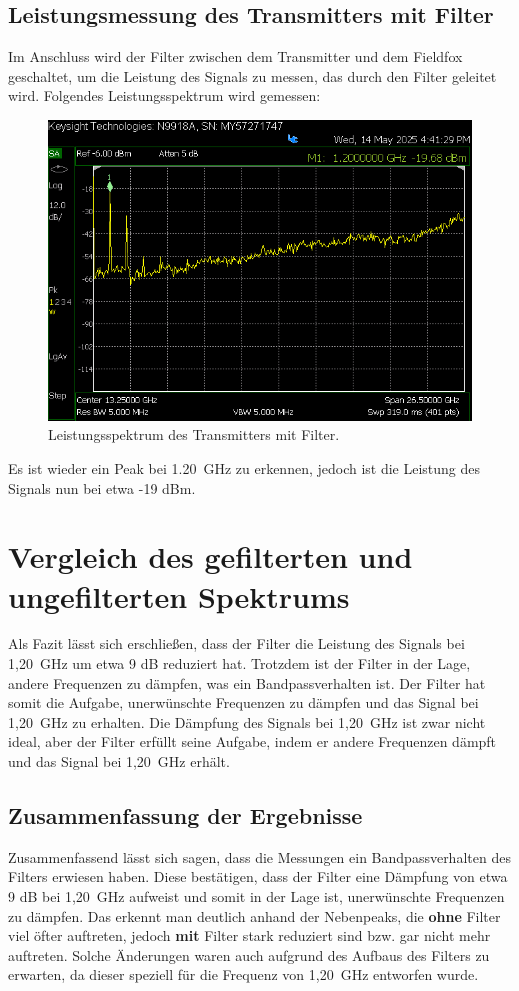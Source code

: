     \subsection{Leistungsmessung des Transmitters mit Filter}
    Im Anschluss wird der Filter zwischen dem Transmitter und dem Fieldfox geschaltet, um die Leistung des Signals zu messen, das durch den Filter geleitet wird.
    Folgendes Leistungsspektrum wird gemessen:
    \begin{figure}[H]
        \centering
        \includegraphics[width=0.6\linewidth]{Pictures/SA-TranceiverMitFIlterPeakCooleGruppe.png}
        \caption{Leistungsspektrum des Transmitters mit Filter.}
        \label{fig:transmitter_spectrum_with_filter}
    \end{figure}
    Es ist wieder ein Peak bei 1.20~GHz zu erkennen, jedoch ist die Leistung des Signals nun bei etwa -19 dBm. 
\section{Vergleich des gefilterten und ungefilterten Spektrums}
Als Fazit lässt sich erschließen, dass der Filter die Leistung des Signals bei 1,20~GHz um etwa 9 dB reduziert hat. Trotzdem ist der Filter in der Lage, andere Frequenzen zu dämpfen, was ein Bandpassverhalten ist. 
    Der Filter hat somit die Aufgabe, unerwünschte Frequenzen zu dämpfen und das Signal bei 1,20~GHz zu erhalten. 
    Die Dämpfung des Signals bei 1,20~GHz ist zwar nicht ideal, aber der Filter erfüllt seine Aufgabe, indem er andere Frequenzen dämpft und das Signal bei 1,20~GHz erhält.

    \subsection{Zusammenfassung der Ergebnisse}
    Zusammenfassend lässt sich sagen, dass die Messungen ein Bandpassverhalten des Filters erwiesen haben.
    Diese bestätigen, dass der Filter eine Dämpfung von etwa 9 dB bei 1,20~GHz aufweist und somit in der Lage ist, unerwünschte Frequenzen zu dämpfen. Das erkennt man deutlich anhand der Nebenpeaks, die \textbf{ohne} Filter viel öfter auftreten, jedoch \textbf{mit} Filter stark reduziert sind bzw. gar nicht mehr auftreten.
    Solche Änderungen waren auch aufgrund des Aufbaus des Filters zu erwarten, da dieser speziell für die Frequenz von 1,20~GHz entworfen wurde.